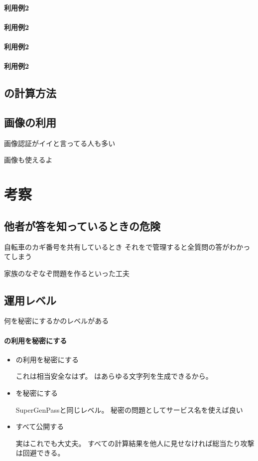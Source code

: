 \documentclass[twoside]{wiss}
\begin{document}
\paragraph{利用例2}
\paragraph{利用例2}
\paragraph{利用例2}
\paragraph{利用例2}

\subsection{{\PW}の計算方法}

\subsection{画像の利用}

画像認証がイイと言ってる人も多い

画像も使えるよ

\section{考察}

\subsection{他者が答を知っているときの危険}

自転車のカギ番号を共有しているとき
それを{\EP}で管理すると全質問の答がわかってしまう

家族のなぞなぞ問題を作るといった工夫

\subsection{運用レベル}

何を秘密にするかのレベルがある

\paragraph{{\EP}の利用を秘密にする}

\begin{itemize}
\item {\EP}の利用を秘密にする

これは相当安全なはず。
{\EP}はあらゆる文字列を生成できるから。

\item {\SS}を秘密にする

SuperGenPassと同じレベル。
秘密の問題としてサービス名を使えば良い

\item すべて公開する

実はこれでも大丈夫。
すべての計算結果を他人に見せなければ総当たり攻撃は回避できる。

\end{itemize}
\end{document}
